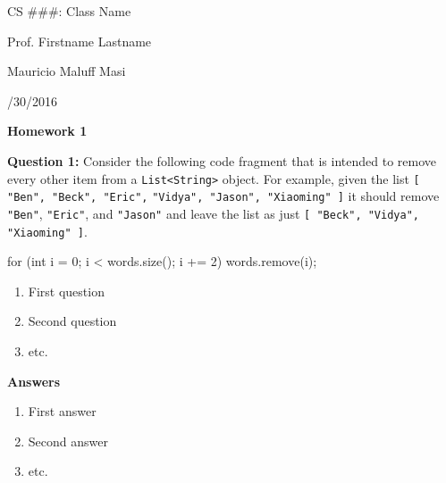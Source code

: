 \documentclass[letter,12pt]{article}
\newcommand{\code}{\texttt} %
\begin{document}
\noindent CS \#\#\#: Class Name

\noindent Prof. Firstname Lastname

\noindent Mauricio Maluff Masi

/30/2016

{\centering
\large{\textbf{Homework 1}}

}
\vspace{12pt}
\noindent\textbf{Question 1:} Consider the following code fragment that is intended to remove every other item from a \code{List<String>} object. For example, given the list \code{[ "Ben", "Beck", "Eric",}
\code{"Vidya", "Jason", "Xiaoming" ]} it should remove \code{"Ben"}, \code{"Eric"}, and \code{"Jason"} and leave the list as just \code{[ "Beck", "Vidya", "Xiaoming" ]}.

\begin{javacode}
for (int i = 0; i < words.size(); i += 2) {
    words.remove(i); 
} 
\end{javacode}

\begin{enumerate}[label=\emph{\Alph*}.]
	\item First question
	\item Second question
	\item etc.
\end{enumerate}

\noindent\textbf{Answers}
\begin{enumerate}[label=\emph{\Alph*}.]
	\item First answer
	\item Second answer
	\item etc.

\end{enumerate}
\end{document}

